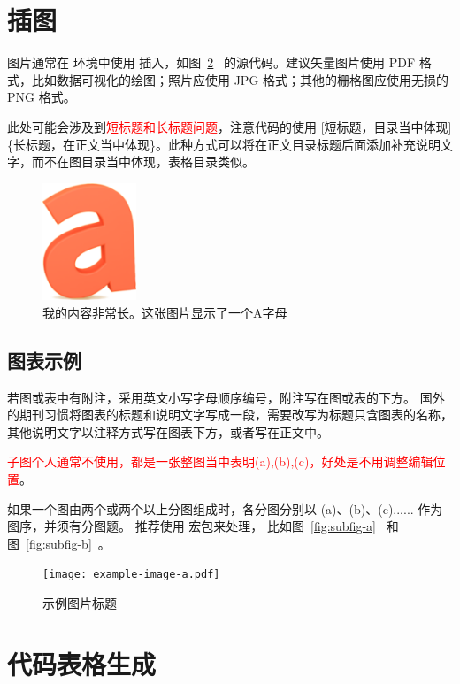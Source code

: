 \section{插图}

图片通常在  环境中使用  插入，如图~\ref{fig:example}~ 的源代码。建议矢量图片使用 PDF 格式，比如数据可视化的绘图；照片应使用 JPG 格式；其他的栅格图应使用无损的 PNG 格式。

此处可能会涉及到\textcolor{red}{短标题和长标题问题}，注意代码的使用 [短标题，目录当中体现]\{长标题，在正文当中体现\}。此种方式可以将在正文目录标题后面添加补充说明文字，而不在图目录当中体现，表格目录类似。
\begin{figure}[htb]
  \centering
  \includegraphics[width=0.25\textwidth]{figures/demo.png}
  \caption[内容精简出现在表目录]{我的内容非常长。这张图片显示了一个A字母}
  \label{fig:demo}
\end{figure}

\subsection{图表示例}
若图或表中有附注，采用英文小写字母顺序编号，附注写在图或表的下方。
国外的期刊习惯将图表的标题和说明文字写成一段，需要改写为标题只含图表的名称，其他说明文字以注释方式写在图表下方，或者写在正文中。

\textcolor{red}{子图个人通常不使用，都是一张整图当中表明(a),(b),(c)，好处是不用调整编辑位置}。
\par 如果一个图由两个或两个以上分图组成时，各分图分别以 (a)、(b)、(c)...... 作为图序，并须有分图题。
推荐使用  宏包来处理， 比如图~\ref{fig:subfig-a}~ 和图~\ref{fig:subfig-b}~。
\begin{figure}[htb]
  \centering
  \texttt{[image: example-image-a.pdf]}
  \caption{示例图片标题}
  \label{fig:example}
\end{figure}

\section{代码表格生成}
